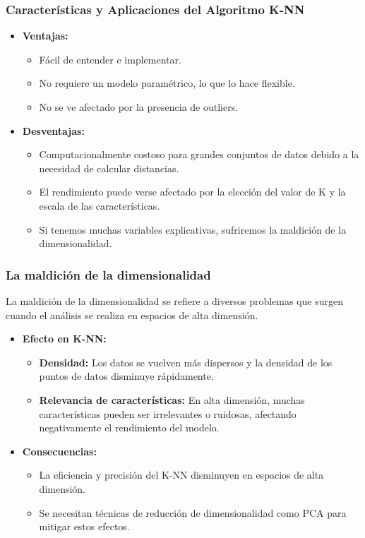 \documentclass[aspectratio=169,12pt]{beamer}
\begin{document}
\begin{frame}
\frametitle{Características y Aplicaciones del Algoritmo K-NN}
\begin{itemize}
    \item \textbf{Ventajas:}
    \begin{itemize}
        \item Fácil de entender e implementar.
        \item No requiere un modelo paramétrico, lo que lo hace flexible.
        \item No se ve afectado por la presencia de outliers.
    \end{itemize}
    \item \textbf{Desventajas:}
    \begin{itemize}
        \item Computacionalmente costoso para grandes conjuntos de datos debido a la necesidad de calcular distancias.
        \item El rendimiento puede verse afectado por la elección del valor de K y la escala de las características.
        \item Si tenemos muchas variables explicativas, sufriremos la maldición de la dimensionalidad.
    \end{itemize}
\end{itemize}
\end{frame}

\begin{frame}
    \frametitle{La maldición de la dimensionalidad}
    La maldición de la dimensionalidad se refiere a diversos problemas que surgen cuando el análisis se realiza en espacios de alta dimensión.
    \begin{itemize}
        \item \textbf{Efecto en K-NN:}
        \begin{itemize}
            \item \textbf{Densidad:} Los datos se vuelven más dispersos y la densidad de los puntos de datos disminuye rápidamente.
            \item \textbf{Relevancia de características:} En alta dimensión, muchas características pueden ser irrelevantes o ruidosas, afectando negativamente el rendimiento del modelo.
        \end{itemize}
        \item \textbf{Consecuencias:}
        \begin{itemize}
            \item La eficiencia y precisión del K-NN disminuyen en espacios de alta dimensión.
            \item Se necesitan técnicas de reducción de dimensionalidad como PCA para mitigar estos efectos.
        \end{itemize}
    \end{itemize}
\end{frame}
\end{document}
